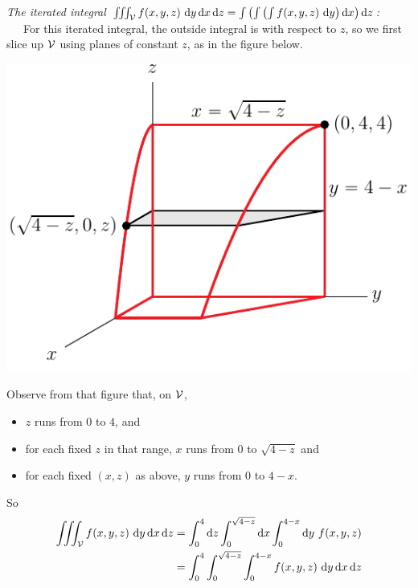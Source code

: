 \begin{eg}
\goodbreak\noindent
\emph{The iterated integral 
   $\iiint_{\mathcal{V}} f(x, y, z)\ \mathrm{d}y\,\mathrm{d}x \,\mathrm{d}z
   =\int\left(\int\left(\int f(x, y, z)\ \mathrm{d}y\right)\mathrm{d}x \right)\mathrm{d}z$:}
    \ \ \ 
For this iterated integral, the outside integral is with respect to
$z$, so we first slice up $\mathcal{V}$ using planes of constant $z$,
as in the figure below.
\begin{nfig}
\begin{center}
    \includegraphics{limits3dE.pdf}
\end{center}
\end{nfig}
Observe from that figure that, on $\mathcal{V}$,
\begin{itemize} \itemsep1pt \parskip0pt 
\item
$z$ runs from $0$ to $4$, and
\item
for each fixed $z$ in that range, $x$ runs from $0$ to $\sqrt{4-z}$ and
\item
for each fixed $(x,z)$ as above,
$y$ runs from $0$ to $4-x$.
\end{itemize}
So
\begin{align*}
\iiint_{\mathcal{V}} f(x, y, z)\ \mathrm{d}y\,\mathrm{d}x \,\mathrm{d}z
&=\int_0^4 \mathrm{d}z \int_0^{\sqrt{4-z}} \mathrm{d}x\int_0^{4-x}\mathrm{d}y\  f(x, y, z)\\
&=\int_0^4  \int_0^{\sqrt{4-z}} \int_0^{4-x}f(x, y, z)
            \ \mathrm{d}y\,\mathrm{d}x\,\mathrm{d}z
\end{align*}

\end{eg}

